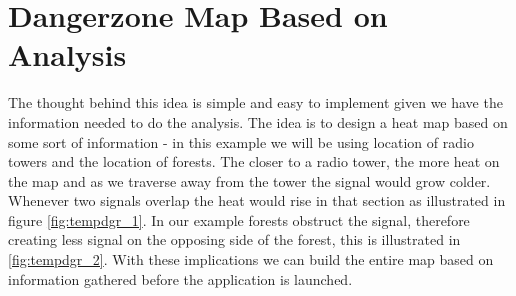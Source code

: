 \section{Dangerzone Map Based on Analysis}
\label{sec:dgrzone}

The thought behind this idea is simple and easy to implement given we have the information needed to do the analysis. The idea is to design a heat map based on some sort of information - in this example we will be using location of radio towers and  the location of forests. The closer to a radio tower, the more heat on the map and as we traverse away from the tower the signal would grow colder. Whenever two signals overlap the heat would rise in that section as illustrated in figure \ref{fig:tempdgr_1}. In our example forests obstruct the signal, therefore creating less signal on the opposing side of the forest, this is illustrated in \ref{fig:tempdgr_2}. With these implications we can build the entire map based on information gathered before the application is launched. 

